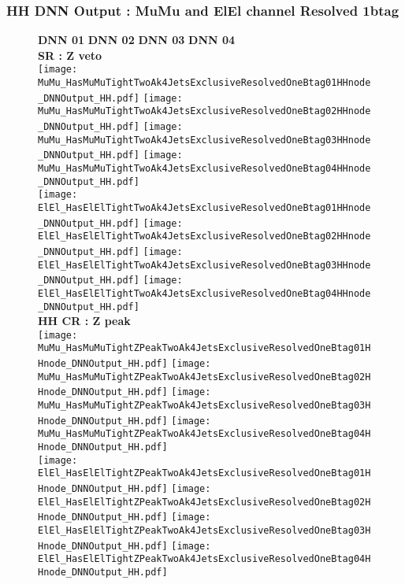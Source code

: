 \documentclass[9pt]{beamer}
\begin{document}
\begin{frame}
	\frametitle{HH DNN Output : MuMu and ElEl channel Resolved 1btag}
	\begin{figure}
	    \textbf{DNN 01} \hspace{1.2cm} \textbf{DNN 02} \hspace{1.2cm} \textbf{DNN 03} \hspace{1.2cm} \textbf{DNN 04} \\
        \centering
        \textbf{SR : Z veto} \\
		\texttt{[image: MuMu\_HasMuMuTightTwoAk4JetsExclusiveResolvedOneBtag01HHnode\_DNNOutput\_HH.pdf]}
		\texttt{[image: MuMu\_HasMuMuTightTwoAk4JetsExclusiveResolvedOneBtag02HHnode\_DNNOutput\_HH.pdf]}
		\texttt{[image: MuMu\_HasMuMuTightTwoAk4JetsExclusiveResolvedOneBtag03HHnode\_DNNOutput\_HH.pdf]}
		\texttt{[image: MuMu\_HasMuMuTightTwoAk4JetsExclusiveResolvedOneBtag04HHnode\_DNNOutput\_HH.pdf]}\\
		\texttt{[image: ElEl\_HasElElTightTwoAk4JetsExclusiveResolvedOneBtag01HHnode\_DNNOutput\_HH.pdf]}
		\texttt{[image: ElEl\_HasElElTightTwoAk4JetsExclusiveResolvedOneBtag02HHnode\_DNNOutput\_HH.pdf]}
		\texttt{[image: ElEl\_HasElElTightTwoAk4JetsExclusiveResolvedOneBtag03HHnode\_DNNOutput\_HH.pdf]}
		\texttt{[image: ElEl\_HasElElTightTwoAk4JetsExclusiveResolvedOneBtag04HHnode\_DNNOutput\_HH.pdf]}\\
        \textbf{HH CR : Z peak} \\
		\texttt{[image: MuMu\_HasMuMuTightZPeakTwoAk4JetsExclusiveResolvedOneBtag01HHnode\_DNNOutput\_HH.pdf]}
		\texttt{[image: MuMu\_HasMuMuTightZPeakTwoAk4JetsExclusiveResolvedOneBtag02HHnode\_DNNOutput\_HH.pdf]}
		\texttt{[image: MuMu\_HasMuMuTightZPeakTwoAk4JetsExclusiveResolvedOneBtag03HHnode\_DNNOutput\_HH.pdf]}
		\texttt{[image: MuMu\_HasMuMuTightZPeakTwoAk4JetsExclusiveResolvedOneBtag04HHnode\_DNNOutput\_HH.pdf]}\\
		\texttt{[image: ElEl\_HasElElTightZPeakTwoAk4JetsExclusiveResolvedOneBtag01HHnode\_DNNOutput\_HH.pdf]}
		\texttt{[image: ElEl\_HasElElTightZPeakTwoAk4JetsExclusiveResolvedOneBtag02HHnode\_DNNOutput\_HH.pdf]}
		\texttt{[image: ElEl\_HasElElTightZPeakTwoAk4JetsExclusiveResolvedOneBtag03HHnode\_DNNOutput\_HH.pdf]}
		\texttt{[image: ElEl\_HasElElTightZPeakTwoAk4JetsExclusiveResolvedOneBtag04HHnode\_DNNOutput\_HH.pdf]}\\
	\end{figure}
\end{frame}
\end{document}
